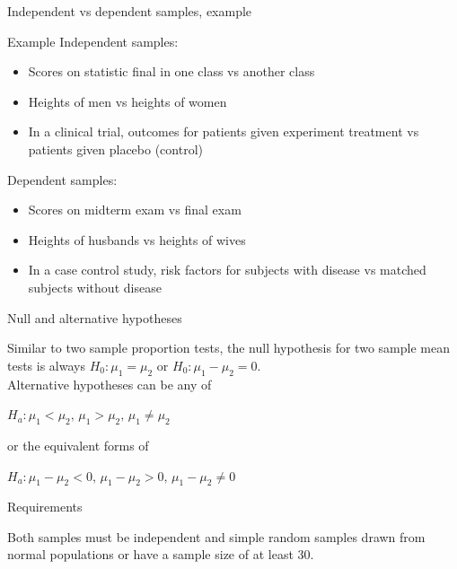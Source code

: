 \documentclass[xcolor=table, handout]{beamer}
\begin{document}
\begin{frame}{Independent vs dependent samples, example}
\begin{exampleblock}{Example}
\large
Independent samples:
\begin{itemize}
\item Scores on statistic final in one class vs another class
\item Heights of men vs heights of women
\item In a clinical trial, outcomes for patients given experiment treatment vs patients given placebo (control)
\end{itemize}
\pause
Dependent samples:
\begin{itemize}
\item Scores on midterm exam vs final exam
\item Heights of husbands vs heights of wives
\item In a case control study, risk factors for subjects with disease vs matched subjects without disease
\end{itemize}
\end{exampleblock}
\end{frame}

\begin{frame}{Null and alternative hypotheses}
\begin{block}{}
\large
Similar to two sample proportion tests, the null hypothesis for two sample mean tests is always $H_0: \mu_1 = \mu_2$ or $H_0: \mu_1 -\mu_2 = 0$.\\
\medskip
Alternative hypotheses can be any of\\
\medskip
{\centering $H_a: \mu_1 < \mu_2, \, \mu_1 > \mu_2, \, \mu_1 \ne \mu_2$ \par}
\medskip
 or the equivalent forms of \\
 \medskip
{\centering $H_a: \mu_1 - \mu_2 < 0, \, \mu_1 - \mu_2 > 0, \, \mu_1 - \mu_2 \ne 0$ \par}
\medskip

\end{block}
\end{frame}

\begin{frame}{Requirements}
\begin{block}{}
\large
Both samples must be independent and simple random samples drawn from normal populations or have a sample size of at least 30.
\end{block}
\end{frame}
\end{document}
